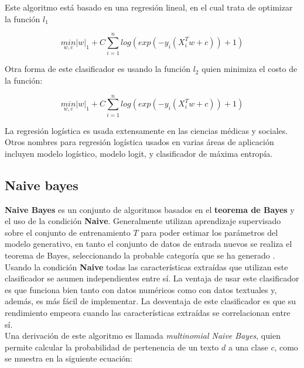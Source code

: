 Este algoritmo está basado en una regresión lineal, en el cual trata de optimizar la función $l_1$

\begin{equation}
\underset{w,c}{min}{\left|w\right|}_1+C\sum_{i=1}^{n}log(exp(-y_i(X_{i}^{T} w+c ))+1)
\end{equation}

Otra forma de este clasificador es usando la función $l_2$ quien minimiza el costo de la función:

\begin{equation}
\underset{w,c}{min}{\left|w\right|}_1+C\sum_{i=1}^{n}log(exp(-y_i(X_{i}^{T} w+c ))+1)
\end{equation}

La regresión logística es usada extensamente en las ciencias médicas y sociales. Otros nombres para regresión logística usados en varias áreas de 
aplicación incluyen modelo logístico, modelo logit, y clasificador de máxima entropía.


\subsection{Naive bayes}


\textbf{Naive Bayes} es un conjunto de algoritmos basados en el \textbf{teorema de Bayes} y el uso de la condición \textbf{Naive}. Generalmente utilizan aprendizaje supervisado sobre el conjunto de entrenamiento  $T$ para poder estimar los parámetros 
del modelo generativo, en tanto el conjunto de datos de entrada nuevos se realiza el teorema de Bayes, seleccionando la probable categoría 
que se ha generado \citep{CT7}.\\


Usando la condición \textbf{Naive} todas las características extraídas que utilizan este clasificador se asumen independientes entre sí. La ventaja de usar este clasificador es que 
funciona bien tanto con datos numéricos como con datos textuales y, además, es más fácil de implementar. La desventaja de este clasificador es 
que su rendimiento empeora cuando las características extraídas se correlacionan entre sí.\\

Una derivación de este algoritmo es llamada \textit{multinomial Naive Bayes}, quien permite calcular la probabilidad de pertenencia de un texto $d$ a una clase $c$, como se muestra en la siguiente ecuación:\\

